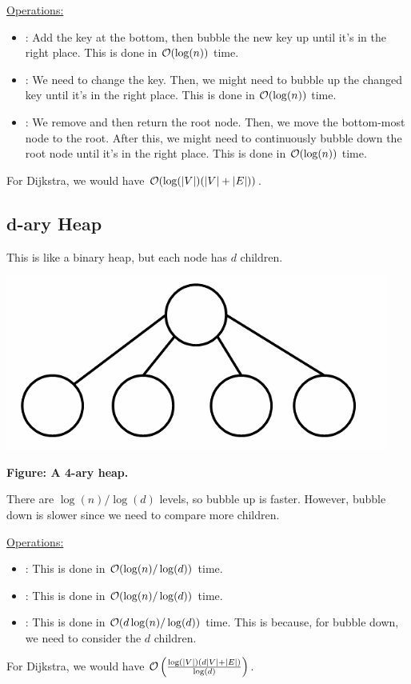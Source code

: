 \documentclass[letterpaper]{article}
\begin{document}
\underline{Operations:}
\begin{itemize}
    \item {}: Add the key at the bottom, then bubble the new key up until it's in the right place. This is done in $\mathcal{O}(\log(n))$ time. 
    \item {}: We need to change the key. Then, we might need to bubble up the changed key until it's in the right place. This is done in $\mathcal{O}(\log(n))$ time. 
    \item {}: We remove and then return the root node. Then, we move the bottom-most node to the root. After this, we might need to continuously bubble down the root node until it's in the right place. This is done in $\mathcal{O}(\log(n))$ time. 
\end{itemize}
For Dijkstra, we would have $\mathcal{O}(\log(|V|)(|V| + |E|))$. 


\subsection{d-ary Heap}
This is like a binary heap, but each node has $d$ children. 
\begin{center}
    \includegraphics[scale=0.5]{../assets/dary_heap.png}

    \textbf{Figure: A 4-ary heap.}
\end{center}

There are $\log(n) / \log(d)$ levels, so bubble up is faster. However, bubble down is slower since we need to compare more children. 

\bigskip 

\underline{Operations:}
\begin{itemize}
    \item {}: This is done in $\mathcal{O}(\log(n) / \log(d))$ time. 
    \item {}: This is done in $\mathcal{O}(\log(n) / \log(d))$ time. 
    \item {}: This is done in $\mathcal{O}(d\log(n) / \log(d))$ time. This is because, for bubble down, we need to consider the $d$ children. 
\end{itemize}
For Dijkstra, we would have $\mathcal{O}\left(\frac{\log(|V|)(d|V| +|E|)}{\log(d)}\right)$. 
\end{document}
